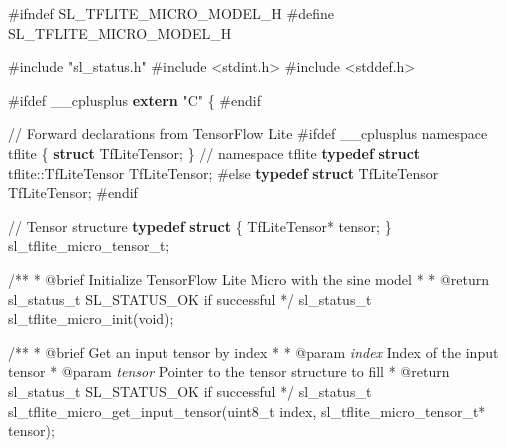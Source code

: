 \documentclass[
  9pt,
  letterpaper,
  abstract,
  titlepage]{scrbook}
\newenvironment{Shaded}{\begin{snugshade}}{\end{snugshade}}
\newcommand{\AnnotationTok}[1]{\textcolor[rgb]{0.37,0.37,0.37}{#1}}
\newcommand{\CommentTok}[1]{\textcolor[rgb]{0.37,0.37,0.37}{#1}}
\newcommand{\CommentVarTok}[1]{\textcolor[rgb]{0.37,0.37,0.37}{\textit{#1}}}
\newcommand{\DataTypeTok}[1]{\textcolor[rgb]{0.68,0.00,0.00}{#1}}
\newcommand{\ImportTok}[1]{\textcolor[rgb]{0.00,0.46,0.62}{#1}}
\newcommand{\KeywordTok}[1]{\textcolor[rgb]{0.00,0.23,0.31}{\textbf{#1}}}
\newcommand{\NormalTok}[1]{\textcolor[rgb]{0.00,0.23,0.31}{#1}}
\newcommand{\OperatorTok}[1]{\textcolor[rgb]{0.37,0.37,0.37}{#1}}
\newcommand{\PreprocessorTok}[1]{\textcolor[rgb]{0.68,0.00,0.00}{#1}}
\newcommand{\StringTok}[1]{\textcolor[rgb]{0.13,0.47,0.30}{#1}}
\begin{document}
\begin{Shaded}
\begin{Highlighting}[]
\PreprocessorTok{\#ifndef SL\_TFLITE\_MICRO\_MODEL\_H}
\PreprocessorTok{\#define SL\_TFLITE\_MICRO\_MODEL\_H}

\PreprocessorTok{\#include }\ImportTok{"sl\_status.h"}
\PreprocessorTok{\#include }\ImportTok{\textless{}stdint.h\textgreater{}}
\PreprocessorTok{\#include }\ImportTok{\textless{}stddef.h\textgreater{}}

\PreprocessorTok{\#ifdef \_\_cplusplus}
\KeywordTok{extern} \StringTok{"C"} \OperatorTok{\{}
\PreprocessorTok{\#endif}

\CommentTok{// Forward declarations from TensorFlow Lite}
\PreprocessorTok{\#ifdef \_\_cplusplus}
\NormalTok{namespace tflite }\OperatorTok{\{}
\KeywordTok{struct}\NormalTok{ TfLiteTensor}\OperatorTok{;}
\OperatorTok{\}}  \CommentTok{// namespace tflite}
\KeywordTok{typedef} \KeywordTok{struct}\NormalTok{ tflite}\OperatorTok{::}\NormalTok{TfLiteTensor TfLiteTensor}\OperatorTok{;}
\PreprocessorTok{\#else}
\KeywordTok{typedef} \KeywordTok{struct}\NormalTok{ TfLiteTensor TfLiteTensor}\OperatorTok{;}
\PreprocessorTok{\#endif}

\CommentTok{// Tensor structure}
\KeywordTok{typedef} \KeywordTok{struct} \OperatorTok{\{}
\NormalTok{  TfLiteTensor}\OperatorTok{*}\NormalTok{ tensor}\OperatorTok{;}
\OperatorTok{\}}\NormalTok{ sl\_tflite\_micro\_tensor\_t}\OperatorTok{;}

\CommentTok{/**}
\CommentTok{ * }\AnnotationTok{@brief}\CommentTok{ Initialize TensorFlow Lite Micro with the sine model}
\CommentTok{ * }
\CommentTok{ * }\AnnotationTok{@return}\CommentTok{ sl\_status\_t SL\_STATUS\_OK if successful}
\CommentTok{ */}
\NormalTok{sl\_status\_t sl\_tflite\_micro\_init}\OperatorTok{(}\DataTypeTok{void}\OperatorTok{);}

\CommentTok{/**}
\CommentTok{ * }\AnnotationTok{@brief}\CommentTok{ Get an input tensor by index}
\CommentTok{ * }
\CommentTok{ * }\AnnotationTok{@param}\CommentTok{ }\CommentVarTok{index}\CommentTok{ Index of the input tensor}
\CommentTok{ * }\AnnotationTok{@param}\CommentTok{ }\CommentVarTok{tensor}\CommentTok{ Pointer to the tensor structure to fill}
\CommentTok{ * }\AnnotationTok{@return}\CommentTok{ sl\_status\_t SL\_STATUS\_OK if successful}
\CommentTok{ */}
\NormalTok{sl\_status\_t sl\_tflite\_micro\_get\_input\_tensor}\OperatorTok{(}\DataTypeTok{uint8\_t}\NormalTok{ index}\OperatorTok{,}\NormalTok{ sl\_tflite\_micro\_tensor\_t}\OperatorTok{*}\NormalTok{ tensor}\OperatorTok{);}


\end{Highlighting}
\end{Shaded}
\end{document}
